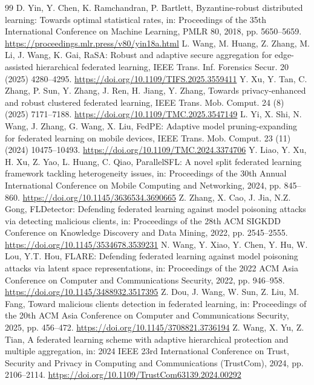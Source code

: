\documentclass[11pt, a4paper]{article}
\begin{document}
\begin{thebibliography}{99}
     D. Yin, Y. Chen, K. Ramchandran, P. Bartlett, Byzantine-robust distributed learning: Towards optimal statistical rates, in: Proceedings of the 35th International Conference on Machine Learning, PMLR 80, 2018, pp. 5650--5659. \url{https://proceedings.mlr.press/v80/yin18a.html}
     L. Wang, M. Huang, Z. Zhang, M. Li, J. Wang, K. Gai, RaSA: Robust and adaptive secure aggregation for edge-assisted hierarchical federated learning, IEEE Trans. Inf. Forensics Secur. 20 (2025) 4280--4295. \url{https://doi.org/10.1109/TIFS.2025.3559411}
     Y. Xu, Y. Tan, C. Zhang, P. Sun, Y. Zhang, J. Ren, H. Jiang, Y. Zhang, Towards privacy-enhanced and robust clustered federated learning, IEEE Trans. Mob. Comput. 24 (8) (2025) 7171--7188. \url{https://doi.org/10.1109/TMC.2025.3547149}
     L. Yi, X. Shi, N. Wang, J. Zhang, G. Wang, X. Liu, FedPE: Adaptive model pruning-expanding for federated learning on mobile devices, IEEE Trans. Mob. Comput. 23 (11) (2024) 10475--10493. \url{https://doi.org/10.1109/TMC.2024.3374706}
     Y. Liao, Y. Xu, H. Xu, Z. Yao, L. Huang, C. Qiao, ParallelSFL: A novel split federated learning framework tackling heterogeneity issues, in: Proceedings of the 30th Annual International Conference on Mobile Computing and Networking, 2024, pp. 845--860. \url{https://doi.org/10.1145/3636534.3690665}
     Z. Zhang, X. Cao, J. Jia, N.Z. Gong, FLDetector: Defending federated learning against model poisoning attacks via detecting malicious clients, in: Proceedings of the 28th ACM SIGKDD Conference on Knowledge Discovery and Data Mining, 2022, pp. 2545--2555. \url{https://doi.org/10.1145/3534678.3539231}
     N. Wang, Y. Xiao, Y. Chen, Y. Hu, W. Lou, Y.T. Hou, FLARE: Defending federated learning against model poisoning attacks via latent space representations, in: Proceedings of the 2022 ACM Asia Conference on Computer and Communications Security, 2022, pp. 946--958. \url{https://doi.org/10.1145/3488932.3517395}
     Z. Dou, J. Wang, W. Sun, Z. Liu, M. Fang, Toward malicious clients detection in federated learning, in: Proceedings of the 20th ACM Asia Conference on Computer and Communications Security, 2025, pp. 456--472. \url{https://doi.org/10.1145/3708821.3736194}
     Z. Wang, X. Yu, Z. Tian, A federated learning scheme with adaptive hierarchical protection and multiple aggregation, in: 2024 IEEE 23rd International Conference on Trust, Security and Privacy in Computing and Communications (TrustCom), 2024, pp. 2106--2114. \url{https://doi.org/10.1109/TrustCom63139.2024.00292}

\end{thebibliography}
\end{document}
